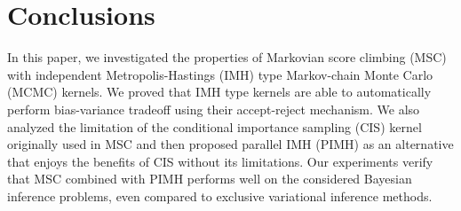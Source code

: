 
\section{Conclusions}
In this paper, we investigated the properties of Markovian score climbing (MSC) with independent Metropolis-Hastings (IMH) type Markov-chain Monte Carlo (MCMC) kernels.
We proved that IMH type kernels are able to automatically perform bias-variance tradeoff using their accept-reject mechanism.
We also analyzed the limitation of the conditional importance sampling (CIS) kernel originally used in MSC and then proposed parallel IMH (PIMH) as an alternative that enjoys the benefits of CIS without its limitations.
Our experiments verify that MSC combined with PIMH performs well on the considered Bayesian inference problems, even compared to exclusive variational inference methods.


